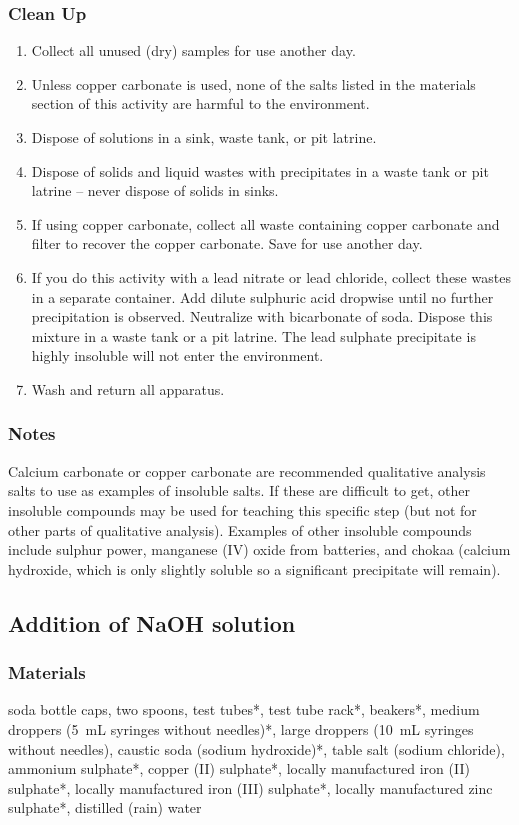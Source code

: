 \subsubsection{Clean Up}
\begin{enumerate}
\item{Collect all unused (dry) samples for use another day.}
\item{Unless copper carbonate is used, none of the salts listed in the materials section of this activity are harmful to the environment.}
\item{Dispose of solutions in a sink, waste tank, or pit latrine.}
\item{Dispose of solids and liquid wastes with precipitates in a waste tank or pit latrine -- never dispose of solids in sinks.}
\item{If using copper carbonate, collect all waste containing copper carbonate and filter to recover the copper carbonate. Save for use another day.}
\item{If you do this activity with a lead nitrate or lead chloride, collect these wastes in a separate container. Add dilute sulphuric acid dropwise until no further precipitation is observed. Neutralize with bicarbonate of soda. Dispose this mixture in a waste tank or a pit latrine. The lead sulphate precipitate is highly insoluble will not enter the environment.}
\item{Wash and return all apparatus.}
\end{enumerate}

\subsubsection{Notes}
Calcium carbonate or copper carbonate are recommended qualitative analysis salts to use as examples of insoluble salts. If these are difficult to get, other insoluble compounds may be used for teaching this specific step (but not for other parts of qualitative analysis). Examples of other insoluble compounds include sulphur power, manganese (IV) oxide from batteries, and chokaa (calcium hydroxide, which is only slightly soluble so a significant precipitate will remain).
\subsection{Addition of NaOH solution}

\subsubsection{Materials}
soda bottle caps, two spoons, test tubes*, test tube rack*, beakers*, medium droppers (5~mL syringes without needles)*, large droppers (10~mL syringes without needles), caustic soda (sodium hydroxide)*, table salt (sodium chloride), ammonium sulphate*, copper (II) sulphate*, locally manufactured iron (II) sulphate*, locally manufactured iron (III) sulphate*, locally manufactured zinc sulphate*, distilled (rain) water

